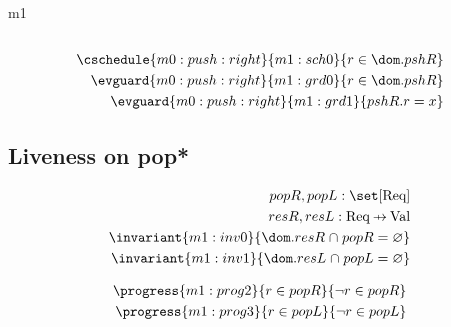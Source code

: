 \documentclass[12pt]{amsart}
\begin{document}
\begin{machine}{m1}
\begin{align*}
\removecoarse{m0:push:right}{default} %
\\ \cschedule{m0:push:right}{m1:sch0}{ r \in \dom.pshR }
\\ \evguard{m0:push:right}{m1:grd0}{ r \in \dom.pshR }
\\ \evguard{m0:push:right}{m1:grd1}{ pshR.r = x }
\end{align*}

\subsection{Liveness on pop*}

\begin{align*}
\variable{ popR, popL : \set [\REQ]}
\\ \variable{ resR, resL : \REQ \pfun \G }
\\ \invariant{m1:inv0}{ \dom.resR \binter popR = \emptyset }
\\ \invariant{m1:inv1}{ \dom.resL \binter popL = \emptyset }
\end{align*}

\begin{align*}
\progress{m1:prog2}
	{ r \in popR }
	{ \neg r \in popR }
\\ \progress{m1:prog3}
	{ r \in popL }
	{ \neg r \in popL  }
\end{align*}


\end{machine}
\end{document}
